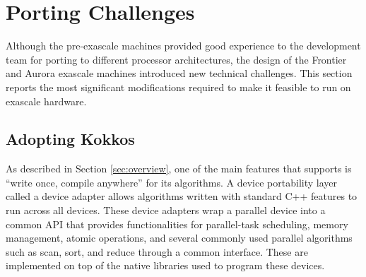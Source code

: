 \section{Porting Challenges}

Although the pre-exascale machines provided good experience to the \vtkm development team for porting to different processor architectures, the design of the Frontier and Aurora exascale machines introduced new technical challenges.
This section reports the most significant modifications required to make it feasible to run \vtkm on exascale hardware.


\subsection{Adopting Kokkos}
\label{sec:adopting-kokkos}


As described in Section \ref{sec:overview},
one of the main features that \vtkm supports is ``write once, compile anywhere'' for its algorithms.
A device portability layer called a device adapter allows algorithms written with standard C++ features to run across all devices.
These device adapters wrap a parallel device into a common API that provides functionalities for parallel-task scheduling, memory management, atomic operations, and several commonly used parallel algorithms such as scan, sort, and reduce through a common interface.
These are implemented on top of the native libraries used to program these devices.

